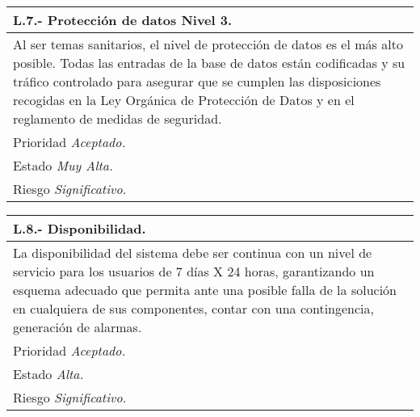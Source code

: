 	\begin{center}
	\begin{tabulary}{15cm}{|L|}
		\hline
			\bf{L.7.- Protección de datos Nivel 3.} \\
		\hline
			Al ser temas sanitarios, el nivel de protección de datos es el más alto posible. Todas las entradas de la base de datos están codificadas y su tráfico controlado para asegurar que se cumplen las disposiciones recogidas en la Ley Orgánica de Protección de Datos y en el reglamento de medidas de seguridad. \\
		\hline
			Prioridad \textit{Aceptado.} \\
		\hline
			Estado \textit{Muy Alta.} \\
		\hline
			Riesgo \textit{Significativo.} \\
		\hline
	\end{tabulary}
	\end{center}

	\begin{center}
	\begin{tabulary}{15cm}{|L|}
		\hline
			\bf{L.8.- Disponibilidad.} \\
		\hline
			La disponibilidad del sistema debe ser continua con un nivel de servicio para los usuarios de 7 días X 24 horas, garantizando un esquema adecuado que permita ante una posible falla de la solución en cualquiera de sus componentes, contar con una contingencia, generación de alarmas. \\
		\hline
			Prioridad \textit{Aceptado.} \\
		\hline
			Estado \textit{Alta.} \\
		\hline
			Riesgo \textit{Significativo.} \\
		\hline
	\end{tabulary}
	\end{center}

